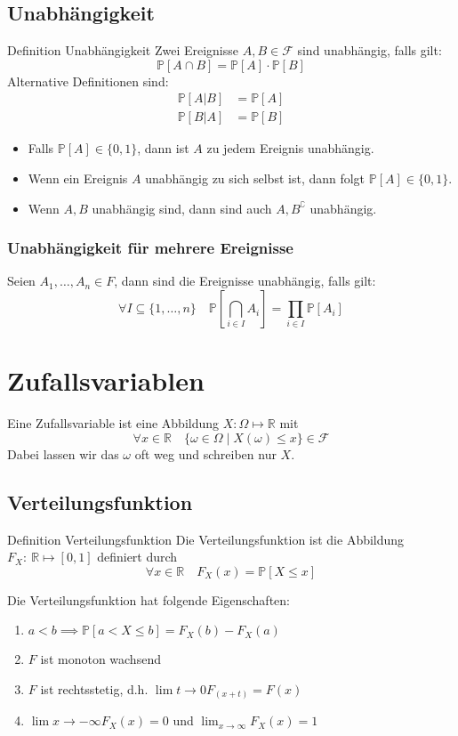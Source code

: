 \documentclass[a4paper,10pt]{article}
\def\R{\mathbb{R}}
\def\P{\mathbb{P}}
\def\F{\mathcal{F}}
\begin{document}
\subsection{Unabhängigkeit}
\begin{mainbox}{Definition Unabhängigkeit}
    Zwei Ereignisse \(A, B\in \F\) sind unabhängig, falls gilt:
    \[\P[A\cap B] = \P[A] \cdot \P[B]\]
    Alternative Definitionen sind:
    \begin{align*}
        \P[A|B] & = \P[A] \\
        \P[B|A] & = \P[B]
    \end{align*}
\end{mainbox}
\begin{itemize}
    \item Falls \(\P[A] \in \{0,1\}\), dann ist \(A\) zu jedem Ereignis unabhängig.
    \item Wenn ein Ereignis \(A\) unabhängig zu sich selbst ist, dann folgt \(\P[A] \in \{0,1\}\).
    \item Wenn \(A, B\) unabhängig sind, dann sind auch \(A, B^\complement\) unabhängig.
\end{itemize}
\subsubsection*{Unabhängigkeit für mehrere Ereignisse}
Seien \(A_1, \ldots, A_n \in F\), dann sind die Ereignisse unabhängig, falls gilt:
\[\forall I \subseteq \{1, \ldots, n\} \quad \P[\bigcap_{i\in I}A_i] = \prod_{i\in I} \P[A_i]\]

\section{Zufallsvariablen}
Eine Zufallsvariable ist eine Abbildung \(X: \Omega \mapsto \R\) mit
\[\forall x \in \R \quad \{\omega \in \Omega \mid X(\omega) \leq x\} \in \F\]
Dabei lassen wir das \(\omega\) oft weg und schreiben nur \(X\).

\subsection{Verteilungsfunktion}
\begin{mainbox}{Definition Verteilungsfunktion}
    Die Verteilungsfunktion ist die Abbildung \(F_X: \ \R \mapsto [0,1]\) definiert durch
    \[\forall x \in \R \quad F_X(x) = \P[X \le x]\]
\end{mainbox}
Die Verteilungsfunktion hat folgende Eigenschaften:
\begin{enumerate}
    \item \(a < b \implies \P[a < X \le b] = F_X(b) - F_X(a)\)
    \item \(F\) ist monoton wachsend
    \item \(F\) ist rechtsstetig, d.h. \(\lim{t \to 0} F_(x+t) = F(x)\)
    \item \(\lim{x\to - \infty} F_X(x) = 0\) und \(\lim_{x\to \infty} F_X(x) = 1\)
\end{enumerate}
\end{document}
